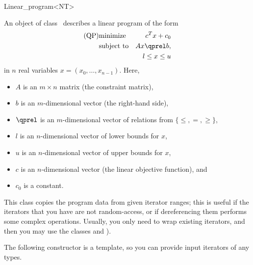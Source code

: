 \begin{ccRefClass}{Linear_program<NT>}


\ccDefinition
An object of class \ccRefName\ describes a linear program of the form
\begin{eqnarray*}
\mbox{(QP)}& \mbox{minimize} & c^{T}x+c_0 \\
&\mbox{subject to}   & Ax\qprel b, \\
&                    & l \leq x \leq u
\end{eqnarray*}
in $n$ real variables $x=(x_0,\ldots,x_{n-1})$.
Here, 
\begin{itemize}
\item $A$ is an $m\times n$ matrix (the constraint matrix), 
\item $b$ is an $m$-dimensional vector (the right-hand side),
\item $\qprel$ is an $m$-dimensional vector of relations 
from $\{\leq, =, \geq\}$, 
\item $l$ is an $n$-dimensional vector of lower
bounds for $x$,
\item $u$ is an $n$-dimensional vector of upper bounds for
$x$, 
\item $c$ is an $n$-dimensional vector (the linear objective
  function), and 
\item $c_0$ is a constant.
\end{itemize}

This class copies the program data from given iterator ranges; this
is useful if the iterators that you have are not random-access, or 
if dereferencing them performs some complex operations. Usually, 
you only need to wrap existing iterators, and then you may use the classes 
 and ).

\ccIsModel
{}

\ccCreation
\ccIndexClassCreation
{}

The following constructor is a template, so you can provide input
iterators of any types.


\ccSeeAlso
{}\\


\end{ccRefClass}
